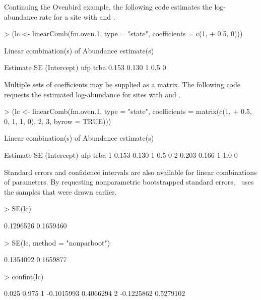 \documentclass[article,shortnames]{jss}
\newcommand{\um}{\pkg{unmarked}}
\begin{document}
Continuing the Ovenbird example, the following code estimates the
log-abundance rate for a site with  and .

\begin{Schunk}
\begin{Sinput}
> (lc <- linearComb(fm.oven.1, type = "state", coefficients = c(1, 
+     0.5, 0)))
\end{Sinput}
\begin{Soutput}
Linear combination(s) of Abundance estimate(s)

 Estimate    SE (Intercept) ufp trba
    0.153 0.130           1 0.5    0
\end{Soutput}
\end{Schunk}

Multiple sets of coefficients may be supplied as a matrix.  The
following code requests the estimated log-abundance for sites with
 and .

\begin{Schunk}
\begin{Sinput}
> (lc <- linearComb(fm.oven.1, type = "state", coefficients = matrix(c(1, 
+     0.5, 0, 1, 1, 0), 2, 3, byrow = TRUE)))
\end{Sinput}
\begin{Soutput}
Linear combination(s) of Abundance estimate(s)

  Estimate    SE (Intercept) ufp trba
1    0.153 0.130           1 0.5    0
2    0.203 0.166           1 1.0    0
\end{Soutput}
\end{Schunk}

Standard errors and confidence intervals are also available for linear
combinations of parameters.  By requesting nonparametric bootstrapped
standard errors, \um\ uses the samples that were drawn earlier.

\begin{Schunk}
\begin{Sinput}
> SE(lc)
\end{Sinput}
\begin{Soutput}
[1] 0.1296526 0.1659460
\end{Soutput}
\begin{Sinput}
> SE(lc, method = "nonparboot")
\end{Sinput}
\begin{Soutput}
[1] 0.1354092 0.1659877
\end{Soutput}
\begin{Sinput}
> confint(lc)
\end{Sinput}
\begin{Soutput}
       0.025     0.975
1 -0.1015993 0.4066294
2 -0.1225862 0.5279102
\end{Soutput}
\end{Schunk}
\end{document}
